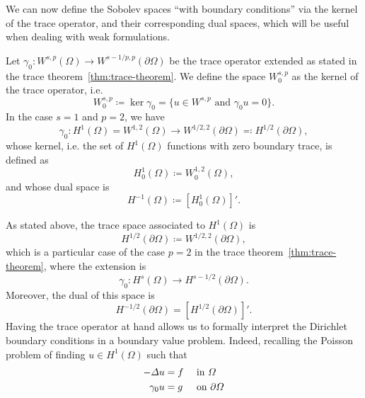 We can now define the Sobolev spaces ``with boundary conditions'' via the kernel of the trace operator, and their corresponding dual spaces, which will be useful when dealing with weak formulations.
\begin{definition}\label{def:sobolev-spaces-zerobc}
    Let $\gamma_0: W^{s,p}(\Omega) \to W^{s-1/p, p}(\partial\Omega)$ be the trace operator extended as stated in the trace theorem~\ref{thm:trace-theorem}. We define the space $W_0^{s,p}$ as the kernel of the trace operator, i.e. %
    \begin{equation}\label{eq:def-W0sp}
        W_0^{s,p} \coloneqq \ker \gamma_0 = \{ u \in W^{s,p} \text{ and } \gamma_0 u = 0 \}.
    \end{equation}
    In the case $s=1$ and $p=2$, we have
    \begin{equation*}
        \gamma_0: H^1(\Omega)=W^{1,2}(\Omega)\to W^{1/2,2}(\partial\Omega) \eqqcolon H^{1/2}(\partial\Omega),
    \end{equation*}
    whose kernel, i.e. the set of $H^1(\Omega)$ functions with zero boundary trace, is defined as
    \begin{equation}\label{def:H_0^1}
        H_0^1(\Omega) \coloneqq W_0^{1,2}(\Omega),
    \end{equation}
    and whose dual space is 
    \begin{equation}\label{def:H^-1}
        H^{-1}(\Omega) \coloneqq [H_0^1(\Omega)]'.
    \end{equation}
\end{definition} 
As stated above, the trace space associated to $H^1(\Omega)$ is 
\begin{equation}
    H^{1/2}(\partial\Omega) \coloneqq W^{1/2,2}(\partial\Omega),
\end{equation}
which is a particular case of the case $p=2$ in the trace theorem~\ref{thm:trace-theorem}, where the extension is 
\begin{equation*}
    \gamma_0: H^{s}(\Omega) \to H^{s-1/2}(\partial\Omega).
\end{equation*}
Moreover, the dual of this space is 
\begin{equation}
    H^{-1/2}(\partial\Omega) = [H^{1/2}(\partial\Omega)]'.
\end{equation}
Having the trace operator at hand allows us to formally interpret the Dirichlet boundary conditions in a boundary value problem. Indeed, recalling the Poisson problem of finding $u\in H^1(\Omega)$ such that
\begin{equation*}
    \begin{aligned}
        -\Delta u &= f &&\text{ in } \Omega\\
        \gamma_0 u &= g &&\text{ on } \partial\Omega
    \end{aligned}
\end{equation*}
